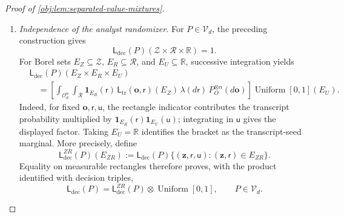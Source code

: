 \begin{proof}[Proof of \cref{obj:lem:separated-value-mixtures}]
\begin{enumerate}
For a probability law \(P\), the finite atomic decomposition is
\[
P_O^{\otimes n}
=
\sum_{\mathbf o\in\mathcal O_d^n}
\left(\prod_{i=1}^nP_O(\{o_i\})\right)\delta_{\mathbf o}.
\]
Consequently, integrating the protocol against the canonical product sampling law gives exactly \(\mathsf L_{\mathrm{dec}}(P)\). Moreover, \cref{obj:ass:iid-people,obj:ass:independent-randomness} give, for every \(P\in\mathcal V_d\),
\[
\mathcal L_P(\mathbf O,R,U)
=
P_O^{\otimes n}\otimes\lambda
\otimes\operatorname{Uniform}[0,1],
\qquad
\mathsf L_{\mathrm{dec}}(P)
=
\mathcal L_{P,Q}(\mathbf Z,R,U).
\]
Define the completed mixtures, for \(\ell\in\{0,1\}\), by
\[
\mathsf L_\ell(E)
:=
\int \mathsf L_{\mathrm{dec}}(P)(E)\,\pi_\ell(dP).
\]
Causal support and the preceding equality imply
\[
\mathsf L_\ell(E)
=
\int_{\mathcal V_d}
\Pr_{P,Q}\{(\mathbf Z,R,U)\in E\}\,\pi_\ell(dP).
\]
Thus these are the decision mixtures in the statement, and their seed-transcript marginals are \(N_\ell\).

\item \textit{Independence of the analyst randomizer.}
For \(P\in\mathcal V_d\), the preceding construction gives
\[
\mathsf L_{\mathrm{dec}}(P)
(\mathcal Z\times\mathcal R\times\mathbb R)=1.
\]
For Borel sets \(E_Z\subseteq\mathcal Z\), \(E_R\subseteq\mathcal R\), and \(E_U\subseteq\mathbb R\), successive integration yields
\[
\begin{aligned}
&\mathsf L_{\mathrm{dec}}(P)(E_Z\times E_R\times E_U)\\
&\quad=
\left[
\int_{\mathcal O_d^n}\int_{\mathcal R}
\mathbf1_{E_R}(\mathsf r)\,
\mathsf L_{\mathrm{tr}}(\mathbf o,\mathsf r)(E_Z)\,
\lambda(d\mathsf r)\,P_O^{\otimes n}(d\mathbf o)
\right]
\operatorname{Uniform}[0,1](E_U).
\end{aligned}
\]
Indeed, for fixed \(\mathbf o,\mathsf r,\mathsf u\), the rectangle indicator contributes the transcript probability multiplied by
\(\mathbf1_{E_R}(\mathsf r)\mathbf1_{E_U}(\mathsf u)\); integrating in \(\mathsf u\) gives the displayed factor. Taking \(E_U=\mathbb R\) identifies the bracket as the transcript-seed marginal. More precisely, define
\[
\mathsf L_{\mathrm{dec}}^{ZR}(P)(E_{ZR})
:=
\mathsf L_{\mathrm{dec}}(P)
\{(\mathbf z,\mathsf r,\mathsf u):
(\mathbf z,\mathsf r)\in E_{ZR}\}.
\]
Equality on measurable rectangles therefore proves, with the product identified with decision triples,
\[
\mathsf L_{\mathrm{dec}}(P)
=
\mathsf L_{\mathrm{dec}}^{ZR}(P)
\otimes\operatorname{Uniform}[0,1],
\qquad P\in\mathcal V_d.
\]


\end{enumerate}
\end{proof}
